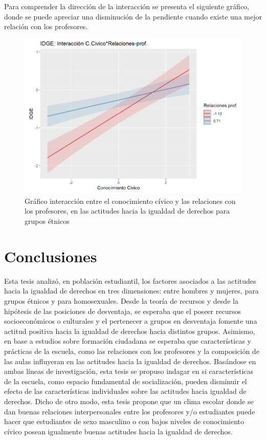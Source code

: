 \documentclass[12pt,twoside]{templates/facsothesis}
\begin{document}
Para comprender la dirección de la interacción se presenta el siguiente gráfico, donde se puede apreciar una disminución de la pendiente cuando existe una mejor relación con los profesores.

\begin{figure}[H]

{\centering \includegraphics[width=1\linewidth]{input/images/PLOTINT4} 

}

\caption{Gráfico interacción entre el conocimiento cívico y las relaciones con los profesores, en las actitudes hacia la igualdad de derechos para grupos étnicos}\label{fig:unnamed-chunk-17}
\end{figure}

\hypertarget{conclusiones}{%
\chapter{Conclusiones}\label{conclusiones}}

Esta tesis analizó, en población estudiantil, los factores asociados a las actitudes hacia la igualdad de derechos en tres dimensiones: entre hombres y mujeres, para grupos étnicos y para homosexuales. Desde la teoría de recursos y desde la hipótesis de las posiciones de desventaja, se esperaba que el poseer recursos socioeconómicos o culturales y el pertenecer a grupos en desventaja fomente una actitud positiva hacia la igualdad de derechos hacia distintos grupos. Asimismo, en base a estudios sobre formación ciudadana se esperaba que características y prácticas de la escuela, como las relaciones con los profesores y la composición de las aulas influyeran en las actitudes hacia la igualdad de derechos. Basándose en ambas líneas de investigación, esta tesis se propuso indagar en si características de la escuela, como espacio fundamental de socialización, pueden disminuir el efecto de las características individuales sobre las actitudes hacia igualdad de derechos. Dicho de otro modo, esta tesis propone que un clima escolar donde se dan buenas relaciones interpersonales entre los profesores y/o estudiantes puede hacer que estudiantes de sexo masculino o con bajos niveles de conocimiento cívico posean igualmente buenas actitudes hacia la igualdad de derechos.
\end{document}
